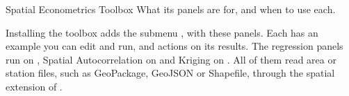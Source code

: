 
\renewcommand{\vignetteauthor}{Pollis}
\renewcommand{\vignettedate}{22 November 2026}
\renewcommand{\vignettelicense}{AGPL-3.0}



  {Spatial Econometrics Toolbox}
  {What its panels are for, and when to use each.}

Installing the toolbox adds the submenu , with these panels. Each has an example you can edit and run, and actions on its results. The regression panels run on , Spatial Autocorrelation on  and Kriging on . All of them read area or station files, such as GeoPackage, GeoJSON or Shapefile, through the spatial extension of .

